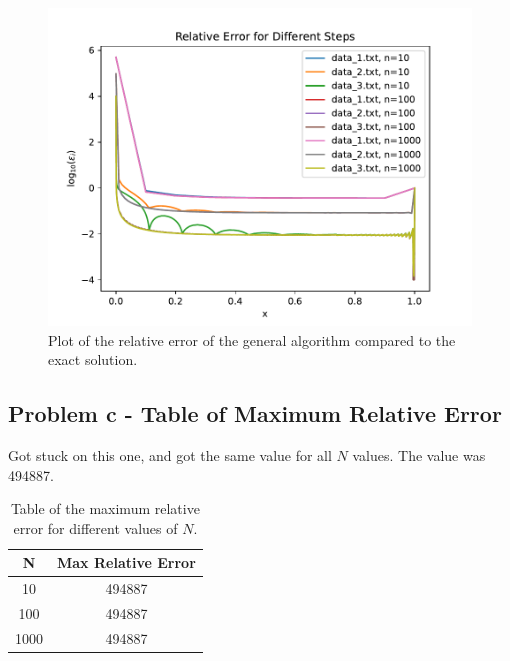 \documentclass[english,notitlepage]{revtex4-1}  %
\begin{document}
\begin{figure}[h!]
    \centering %
    \includegraphics[scale=0.70]{problem8/relative_error_plot.pdf} %
    \caption{Plot of the relative error of the general algorithm compared to the exact solution.} %
    \label{fig:relative_error} %
\end{figure}

\subsection*{Problem c - Table of Maximum Relative Error}

Got stuck on this one, and got the same value for all \( N \) values. The value was 494887.

\begin{table}
    \centering
    \begin{tabular}{|c|c|}
        \hline
        \textbf{N} & \textbf{Max Relative Error} \\
        \hline
        10          & 494887                   \\
        100         & 494887                   \\
        1000        & 494887                   \\
        \hline
    \end{tabular}
    \caption{Table of the maximum relative error for different values of \( N \).}
    \label{tab:relative_error}
\end{table}
\end{document}
